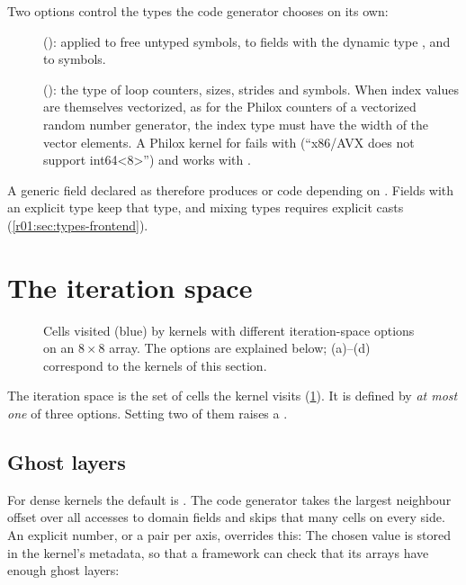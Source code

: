 Two options control the types the code generator chooses on its own:
\begin{description}
  \item[] (): applied to free untyped symbols, to
        fields with the dynamic type , and to
         symbols.
  \item[] (): the type of loop counters, sizes, strides
        and  symbols. When index values are themselves
        vectorized, as for the Philox counters of a vectorized random number generator,
        the index type must have the width of the vector elements. A 
        Philox kernel for  fails with  (``x86/AVX does not
        support int64<8>'') and works with .
\end{description}
A generic field declared as  therefore produces  or
 code depending on . Fields with an explicit type keep
that type, and mixing types requires explicit casts (\cref{r01:sec:types-frontend}).

\section{The iteration space}\label{r01:sec:iteration-space}


\begin{figure}[htbp]
  \centering
  
  \caption[Iteration-space options]{Cells visited (blue) by kernels with different iteration-space options on an $8\times8$ array. The options are explained below; (a)--(d) correspond to the kernels of this section.}
  \label{r01:fig:ispaces}
\end{figure}

The iteration space is the set of cells the kernel visits (\cref{r01:fig:ispaces}). It is defined by \emph{at
most one} of three options. Setting two of them raises a .

\subsection{Ghost layers}
For dense kernels the default is . The code generator takes the
largest neighbour offset over all accesses to domain fields and skips that many cells on
every side. An explicit number, or a  pair per axis, overrides this:
The chosen value is stored in the kernel's metadata, so that a framework can check that
its arrays have enough ghost layers:

